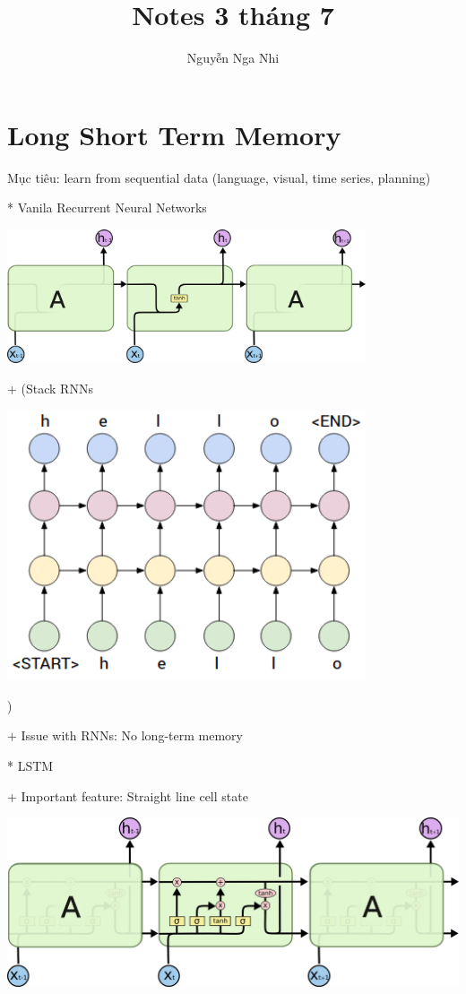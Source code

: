 \documentclass{article}
\title{Notes 3 tháng 7}
\author{Nguyễn Nga Nhi}
\begin{document}
\maketitle

\section{Long Short Term Memory}

Mục tiêu: learn from sequential data (language, visual, time series, planning)

* Vanila Recurrent Neural Networks

\includegraphics[width=300pt]{LSTM3-SimpleRNN.png}

+ (Stack RNNs

\includegraphics[width=300pt]{StackRNNs.png}

)

+ Issue with RNNs: No long-term memory

* LSTM

+ Important feature: Straight line cell state

\includegraphics[width=500pt]{LSTM3-chain.png}
\end{document}

